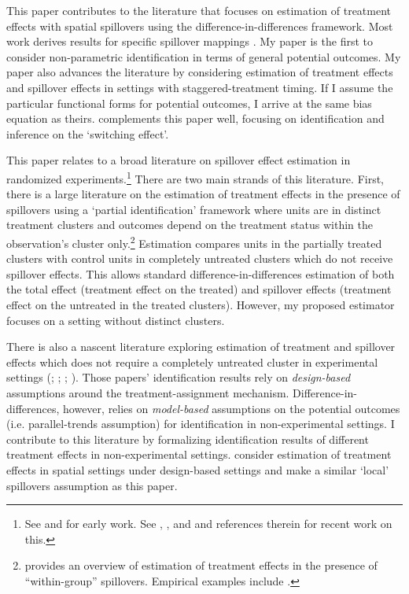 This paper contributes to the literature that focuses on estimation of treatment effects with spatial spillovers using the difference-in-differences framework. Most work derives results for specific spillover mappings \citep{Clarke_2017,Berg_Streitz_2019,veribtsky2021causal,Delgado_Florax_2015}. My paper is the first to consider non-parametric identification in terms of general potential outcomes. My paper also advances the literature by considering estimation of treatment effects and spillover effects in settings with staggered-treatment timing. If I assume the particular functional forms for potential outcomes, I arrive at the same bias equation as theirs. \citet{xu2023difference} complements this paper well, focusing on identification and inference on the `switching effect'. 

This paper relates to a broad literature on spillover effect estimation in randomized experiments.\footnote{See \citet{sobel2006randomized} and \citet{Hudgens_Halloran_2008} for early work. See \citet{Hu_Li_Wager_2021}, \citet{savje2021average}, and \citet{vazquez2023identification} and references therein for recent work on this.} There are two main strands of this literature. First, there is a large literature on the estimation of treatment effects in the presence of spillovers using a `partial identification' framework where units are in distinct treatment clusters and outcomes depend on the treatment status within the observation's cluster only.\footnote{ \citet{Angelucci_DiMaro_2016} provides an overview of estimation of treatment effects in the presence of ``within-group'' spillovers. Empirical examples include \citet{Halloran_Struchiner_1995,sobel2006randomized,Miguel_Kremer_2004,Angrist_2014}.} Estimation compares units in the partially treated clusters with control units in completely untreated clusters which do not receive spillover effects. This allows standard difference-in-differences estimation of both the total effect (treatment effect on the treated) and spillover effects (treatment effect on the untreated in the treated clusters). However, my proposed estimator focuses on a setting without distinct clusters.

There is also a nascent literature exploring estimation of treatment and spillover effects which does not require a completely untreated cluster in experimental settings (\citet{savje2021average}; \citet{vazquez2023identification}; \citet{Hu_Li_Wager_2021}; \citet{yu2022estimating}). Those papers' identification results rely on \textit{design-based} assumptions around the treatment-assignment mechanism. Difference-in-differences, however, relies on \textit{model-based} assumptions on the potential outcomes (i.e. parallel-trends assumption) for identification in non-experimental settings. I contribute to this literature by formalizing identification results of different treatment effects in non-experimental settings. \citet{wang2020design} consider estimation of treatment effects in spatial settings under design-based settings and make a similar `local' spillovers assumption as this paper. 


